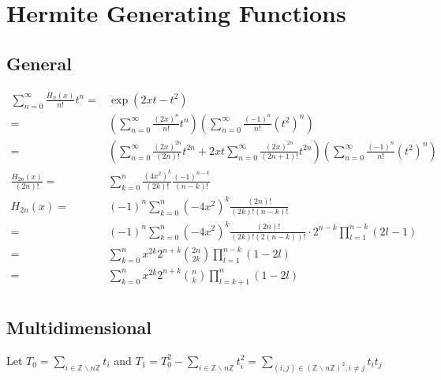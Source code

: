 
\section{Hermite Generating Functions}
\subsection{General}
\begin{equation*}
\begin{aligned}
	\sum_{n=0}^{\infty}\frac{H_n(x)}{n!}t^n =& \exp(2xt-t^2) \\
	=&\left(\sum_{n=0}^{\infty}\frac{(2x)^n}{n!}t^n\right)\left(\sum_{n=0}^{\infty}\frac{(-1)^n}{n!}(t^2)^n\right)\\
	=&\left(\sum_{n=0}^{\infty}\frac{(2x)^{2n}}{(2n)!}t^{2n}+2xt\sum_{n=0}^{\infty}\frac{(2x)^{2n}}{(2n+1)!}t^{2n}\right)\left(\sum_{n=0}^{\infty}\frac{(-1)^n}{n!}(t^2)^n\right)\\
	\frac{H_{2n}(x)}{(2n)!} =& \sum_{k=0}^{n}\frac{(4x^2)^k}{(2k)!}\frac{(-1)^{n-k}}{(n-k)!} \\
	H_{2n}(x)=& (-1)^n\sum_{k=0}^{n}(-4x^2)^k\frac{(2n)!}{(2k)!(n-k)!} \\
	=& (-1)^n\sum_{k=0}^{n}(-4x^2)^k\frac{(2n)!}{(2k)!(2(n-k))!}\cdot2^{n-k}\prod_{l=1}^{n-k}(2l-1)\\
	=& \sum_{k=0}^{n}x^{2k}2^{n+k}\binom{2n}{2k}\prod_{l=1}^{n-k}(1-2l)\\
	=& \sum_{k=0}^{n}x^{2k}2^{n+k}\binom{n}{k}\prod_{l=k+1}^{n}(1-2l)\\
\end{aligned}
\end{equation*}

\subsection{Multidimensional}
Let $T_0 = \sum_{i\in\mathbb{Z}\backslash n\mathbb{Z}}t_i $ and  $T_1 = T_0^2-\sum_{i\in\mathbb{Z}\backslash n\mathbb{Z}}t_i^2 = \sum_{(i,j)\in(\mathbb{Z}\backslash n\mathbb{Z})^2,i\neq j}t_it_j $

